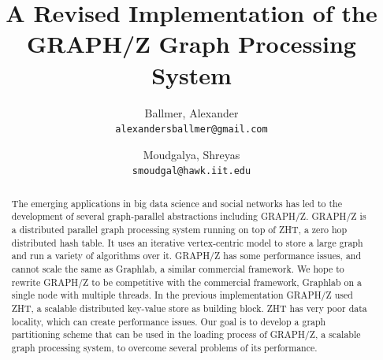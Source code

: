 \documentclass[10pt]{article}
\begin{document}
\nocite{Gz:5}
\title{A Revised Implementation of the GRAPH/Z Graph Processing System}

\author{
  Ballmer, Alexander\\
  \texttt{alexandersballmer@gmail.com}
  \and
  Moudgalya, Shreyas\\
  \texttt{smoudgal@hawk.iit.edu}
}

\maketitle

\begin{abstract}
  The emerging applications in big data science and social networks has led to the development of several graph-parallel abstractions including GRAPH/Z. GRAPH/Z is a distributed parallel graph processing system running on top of ZHT, a zero hop distributed hash table. It uses an iterative vertex-centric model to store a large graph and run a variety of algorithms over it. GRAPH/Z has some performance issues, and cannot scale the same as Graphlab, a similar commercial framework. We hope to rewrite GRAPH/Z to be competitive with the commercial framework, Graphlab on a single node with multiple threads.  In the previous implementation GRAPH/Z used ZHT, a scalable distributed key-value store as building block. ZHT has very poor data locality, which can create performance issues. Our goal is to develop a graph partitioning scheme that can be used in the loading process of GRAPH/Z, a scalable graph processing system, to overcome several problems of its performance.
\end{abstract}
\end{document}

